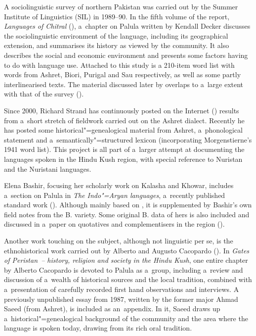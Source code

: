 A sociolinguistic survey of northern Pakistan was carried out by the Summer Institute of Linguistics
(SIL) in 1989--90. In the fifth volume of the report, \textit{Languages of Chitral}
(\citealt{decker1992a}), a~chapter on Palula written by Kendall Decker discusses the
sociolinguistic environment of the language, including its geographical extension, and summarises
its history as viewed by the community. It also describes the social and economic environment and
presents some factors having to do with language use. Attached to this study is a 210-item word list
with words from Ashret, Biori, Purigal and Sau respectively, as well as some partly interlinearised
texts. The material discussed later by \citet{decker1992b,decker1996} overlaps to a~large
extent with that of the survey (\citeyear{decker1992a}).


Since 2000, Richard Strand has continuously posted on the Internet (\citeyear{strand1997/2008})
results from a~short stretch of fieldwork carried out on the Ashret dialect. Recently he has posted
some historical"=genealogical material from Ashret, a~phonological statement and
a~semantically"=structured lexicon (incorporating Morgenstierne's 1941 word list). This project is
all part of a~larger attempt at documenting the languages spoken in the Hindu Kush region, with
special reference to Nuristan and the Nuristani languages.


Elena Bashir, focusing her scholarly work on Kalasha and Khowar, includes a~section on Palula in
\textit{The Indo"=Aryan languages}, a~recently published standard work
(\citeyear{bashir2003}). Although mainly based on \citet{morgenstierne1941}, it is supplemented by
Bashir's own field notes from the B. variety. Some original B. data of hers is also included and
discussed in a~paper on quotatives and complementisers in the region (\citeyear{bashir1996}).


Another work touching on the subject, although not linguistic per se, is the ethnohistorical work
carried out by Alberto and Augusto Cacopardo (\citeyear{cacopardo2001}). In \textit{Gates of
  Peristan~-- history, religion and society in the Hindu Kush}, one entire chapter by Alberto
Cacopardo is devoted to Palula as a~group, including a~review and discussion of a~wealth of
historical sources and the local tradition, combined with a~presentation of carefully recorded first
hand observations and interviews. A previously unpublished essay from 1987, written by the former
major Ahmad Saeed (from Ashret), is included as an~appendix. In it, Saeed draws up
a~historical"=genealogical background of the community and the area where the language is spoken
today, drawing from its rich oral tradition.


